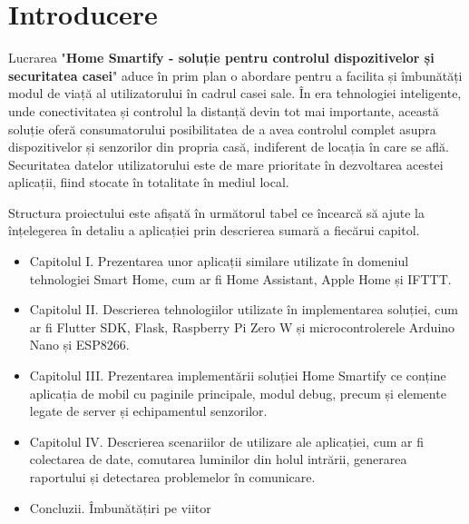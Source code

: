 \chapter*{Introducere} 

Lucrarea "\textbf{Home Smartify - soluție pentru controlul dispozitivelor și securitatea casei}" aduce în prim plan o abordare pentru a facilita și îmbunătăți modul de viață al utilizatorului în cadrul casei sale. În era tehnologiei inteligente, unde conectivitatea și controlul la distanță devin tot mai importante, această soluție oferă consumatorului posibilitatea de a avea controlul complet asupra dispozitivelor și senzorilor din propria casă, indiferent de locația în care se află. Securitatea datelor utilizatorului este de mare prioritate în dezvoltarea acestei aplicații, fiind stocate în totalitate în mediul local.

Structura proiectului este afișată în următorul tabel ce încearcă să ajute la înțelegerea în detaliu a aplicației prin descrierea sumară a fiecărui capitol.

\begin{itemize}
	\item Capitolul I. Prezentarea unor aplicații similare utilizate în domeniul tehnologiei Smart Home, cum ar fi Home Assistant, Apple Home și IFTTT.
	
	\item Capitolul II. Descrierea tehnologiilor utilizate în implementarea soluției, cum ar fi Flutter SDK, Flask, Raspberry Pi Zero W și microcontrolerele Arduino Nano și ESP8266.
	
	\item Capitolul III. Prezentarea implementării soluției Home Smartify ce conține aplicația de mobil cu paginile principale, modul debug, precum și elemente legate de server și
	echipamentul senzorilor.
	
	\item Capitolul IV. Descrierea scenariilor de utilizare ale aplicației, cum ar fi colectarea de date, comutarea luminilor din holul intrării, generarea raportului și detectarea problemelor în comunicare.
	
	\item Concluzii. Îmbunătățiri pe viitor
\end{itemize}